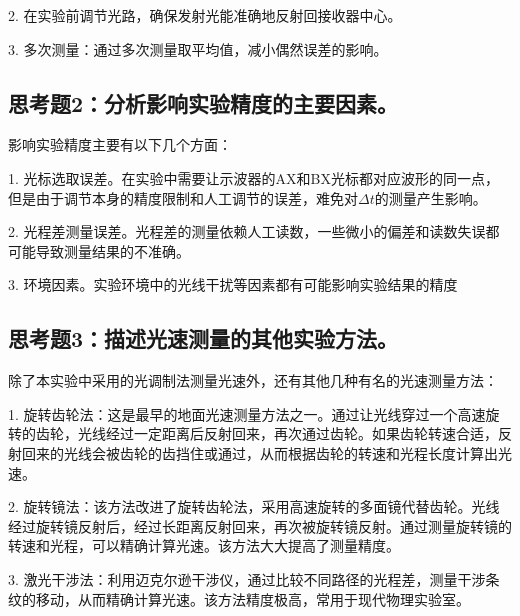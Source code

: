 \documentclass{Phyport}
\begin{document}
2. 在实验前调节光路，确保发射光能准确地反射回接收器中心。

3. 多次测量：通过多次测量取平均值，减小偶然误差的影响。

\subsection{思考题2：分析影响实验精度的主要因素。}

影响实验精度主要有以下几个方面：

1. 光标选取误差。在实验中需要让示波器的AX和BX光标都对应波形的同一点，但是由于调节本身的精度限制和人工调节的误差，难免对$\Delta t$的测量产生影响。

2. 光程差测量误差。光程差的测量依赖人工读数，一些微小的偏差和读数失误都可能导致测量结果的不准确。

3. 环境因素。实验环境中的光线干扰等因素都有可能影响实验结果的精度

\subsection{思考题3：描述光速测量的其他实验方法。}

除了本实验中采用的光调制法测量光速外，还有其他几种有名的光速测量方法：

1. 旋转齿轮法：这是最早的地面光速测量方法之一。通过让光线穿过一个高速旋转的齿轮，光线经过一定距离后反射回来，再次通过齿轮。如果齿轮转速合适，反射回来的光线会被齿轮的齿挡住或通过，从而根据齿轮的转速和光程长度计算出光速。

2. 旋转镜法：该方法改进了旋转齿轮法，采用高速旋转的多面镜代替齿轮。光线经过旋转镜反射后，经过长距离反射回来，再次被旋转镜反射。通过测量旋转镜的转速和光程，可以精确计算光速。该方法大大提高了测量精度。

3. 激光干涉法：利用迈克尔逊干涉仪，通过比较不同路径的光程差，测量干涉条纹的移动，从而精确计算光速。该方法精度极高，常用于现代物理实验室。


\vspace{1cm}

\end{document}
